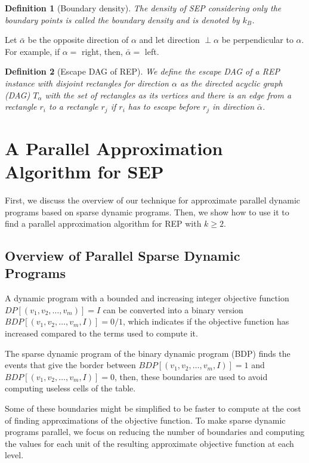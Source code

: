 \documentclass[preprint,12pt]{elsarticle}
\newtheorem{definition}{Definition}
\begin{document}
\begin{definition}[Boundary density]
The density of SEP considering only the boundary points is called the boundary density and is denoted by $k_B$.
\end{definition}

Let $\bar{\alpha}$ be the opposite direction of $\alpha$ and let direction $\perp \alpha$ be perpendicular to $\alpha$. For example, if $\alpha=$ right, then, $\bar{\alpha}=$ left.
\begin{definition}[Escape DAG of REP]
We define the escape DAG of a REP instance with disjoint rectangles for direction $\alpha$ as the directed acyclic graph (DAG) $T_{\alpha}$ with the set of rectangles as its vertices and there is an edge from a rectangle $r_i$ to a rectangle $r_j$ if $r_i$ has to escape before $r_j$ in direction $\bar{\alpha}$.
\end{definition}
\section{A Parallel Approximation Algorithm for SEP}
First, we discuss the overview of our technique for approximate parallel dynamic programs based on sparse dynamic programs. Then, we show how to use it to find a parallel approximation algorithm for REP with $k\geq 2$. 

\subsection{Overview of Parallel Sparse Dynamic Programs}

A dynamic program with a bounded and increasing integer objective function $DP[(v_1,v_2,\ldots,v_m)]=I$ can be converted into a binary version $BDP[(v_1,v_2,\ldots,v_m,I)]=0/1$, which indicates if the objective function has increased compared to the terms used to compute it.

The sparse dynamic program of the binary dynamic program (BDP) finds the events that give the border between $BDP[(v_1,v_2,\ldots,v_m,I)]=1$ and $BDP[(v_1,v_2,\ldots,v_m,I)]=0$, then, these boundaries are used to avoid computing useless cells of the table.

Some of these boundaries might be simplified to be faster to compute at the cost of finding approximations of the objective function. To make sparse dynamic programs parallel, we focus on reducing the number of boundaries and computing the values for each unit of the resulting approximate objective function at each level.
\end{document}
